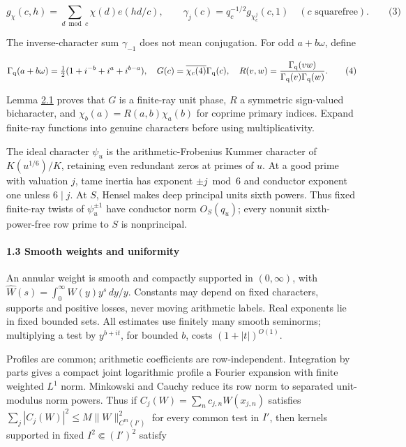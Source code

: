 \hypertarget{cf:eq:1.2}{}

\label{cf:eq:1.2}

\[
g_\chi(c,h)=\sum_{d\bmod c}\chi(d)e(hd/c),\qquad
 \gamma_j(c)=q_c^{-1/2}g_{\chi_c^j}(c,1)\quad(c\text{ squarefree}).
\qquad\text{(3)}
\]

The inverse-character sum \(\gamma_{-1}\) does not mean conjugation. For odd \(a+b\omega\), define

\hypertarget{cf:eq:1.3}{}

\label{cf:eq:1.3}

\[
\Gamma_{\rm q}(a+b\omega)=\tfrac12(1+i^{-b}+i^a+i^{b-a}),\quad
 G(c)=\overline{\chi_c(4)}\Gamma_{\rm q}(c),\quad
 R(v,w)=\frac{\Gamma_{\rm q}(vw)}{\Gamma_{\rm q}(v)\Gamma_{\rm q}(w)}.
\qquad\text{(4)}
\]

Lemma \protect\hyperlink{cf:finite-phases}{2.1} proves that \(G\) is a finite-ray unit phase, \(R\) a symmetric sign-valued bicharacter, and \(\chi_b(a)=R(a,b)\chi_a(b)\) for coprime primary indices. Expand finite-ray functions into genuine characters before using multiplicativity.

The ideal character \(\psi_u\) is the arithmetic-Frobenius Kummer character of \(K(u^{1/6})/K\), retaining even redundant zeros at primes of \(u\). At a good prime with valuation \(j\), tame inertia has exponent \(\pm j\bmod6\) and conductor exponent one unless \(6\mid j\). At \(S\), Hensel makes deep principal units sixth powers. Thus fixed finite-ray twists of \(\psi_u^{\pm1}\) have conductor norm \(O_S(q_u)\); every nonunit sixth-power-free row prime to \(S\) is nonprincipal.

\hypertarget{cf:sec:1.2}{}

\label{cf:sec:1.2}

\hypertarget{smooth-weights-and-uniformity}{%
\paragraph{1.3 Smooth weights and uniformity}\label{smooth-weights-and-uniformity}}

An annular weight is smooth and compactly supported in \((0,\infty)\), with \(\widehat W(s)=\int_0^\infty W(y)y^s\,dy/y\). Constants may depend on fixed characters, supports and positive losses, never moving arithmetic labels. Real exponents lie in fixed bounded sets. All estimates use finitely many smooth seminorms; multiplying a test by \(y^{b+it}\), for bounded \(b\), costs \((1+|t|)^{O(1)}\).

Profiles are common; arithmetic coefficients are row-independent. Integration by parts gives a compact joint logarithmic profile a Fourier expansion with finite weighted \(L^1\) norm. Minkowski and Cauchy reduce its row norm to separated unit-modulus norm powers. Thus if \(C_j(W)=\sum_nc_{j,n}W(x_{j,n})\) satisfies \(\sum_j|C_j(W)|^2\le M\|W\|_{C^m(I')}^2\) for every common test in \(I'\), then kernels supported in fixed \(I^2\Subset(I')^2\) satisfy

